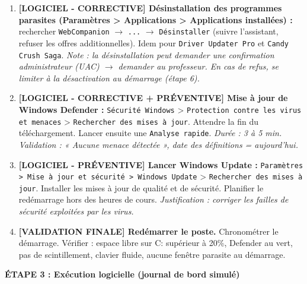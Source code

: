 \documentclass[11pt]{article}
\begin{document}
\begin{exoresolu}
\begin{enumerate}
    \item \textbf{[LOGICIEL - CORRECTIVE] Désinstallation des programmes parasites (Paramètres > Applications > Applications installées) :} rechercher \texttt{WebCompanion} $\rightarrow$ \texttt{...} $\rightarrow$ \texttt{Désinstaller} (suivre l'assistant, refuser les offres additionnelles). Idem pour \texttt{Driver Updater Pro} et \texttt{Candy Crush Saga}. \textit{Note : la désinstallation peut demander une confirmation administrateur (UAC) $\rightarrow$ demander au professeur. En cas de refus, se limiter à la désactivation au démarrage (étape 6).}
    \item \textbf{[LOGICIEL - CORRECTIVE + PRÉVENTIVE] Mise à jour de Windows Defender :} \texttt{Sécurité Windows} > \texttt{Protection contre les virus et menaces} > \texttt{Rechercher des mises à jour}. Attendre la fin du téléchargement. Lancer ensuite une \texttt{Analyse rapide}. \textit{Durée : 3 à 5 min. Validation : « Aucune menace détectée », date des définitions = aujourd'hui.}
    \item \textbf{[LOGICIEL - PRÉVENTIVE] Lancer Windows Update :} \texttt{Paramètres > Mise à jour et sécurité > Windows Update} > \texttt{Rechercher des mises à jour}. Installer les mises à jour de qualité et de sécurité. Planifier le redémarrage hors des heures de cours. \textit{Justification : corriger les failles de sécurité exploitées par les virus.}
    \item \textbf{[VALIDATION FINALE] Redémarrer le poste.} Chronométrer le démarrage. Vérifier : espace libre sur C: supérieur à 20\%, Defender au vert, pas de scintillement, clavier fluide, aucune fenêtre parasite au démarrage.
\end{enumerate}

\textbf{ÉTAPE 3 : Exécution logicielle (journal de bord simulé)}


\end{exoresolu}
\end{document}
